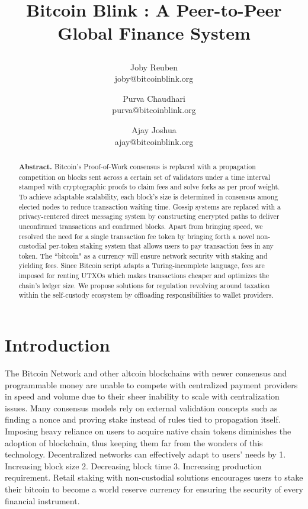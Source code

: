 \documentclass[a4paper, 10pt]{extarticle}
\title{
 \large \textbf{Bitcoin Blink : A Peer-to-Peer Global Finance System}
\author{ \myfontt Joby Reuben \\ \myfontt joby@bitcoinblink.org \and  \myfontt Purva Chaudhari \\ \myfontt purva@bitcoinblink.org \and \myfontt Ajay Joshua \\ \myfontt ajay@bitcoinblink.org}}
\date{}
\begin{document}
\maketitle
\begin{abstract}
\noindent \textbf{Abstract.} Bitcoin's Proof-of-Work consensus is replaced with a propagation competition on blocks sent across a certain set of validators under a time interval stamped with cryptographic proofs to claim fees and solve forks as per proof weight. To achieve adaptable scalability, each block's size is determined in consensus among elected nodes to reduce transaction waiting time. Gossip systems are replaced with a privacy-centered direct messaging system by constructing encrypted paths to deliver unconfirmed transactions and confirmed blocks. Apart from bringing speed, we resolved the need for a single transaction fee token by bringing forth a novel non-custodial per-token staking system that allows users to pay transaction fees in any token. The ``bitcoin" as a currency will ensure network security with staking and yielding fees. Since Bitcoin script adapts a Turing-incomplete language, fees are imposed for renting UTXOs which makes transactions cheaper and optimizes the chain's ledger size. We propose solutions for regulation revolving around taxation within the self-custody ecosystem by offloading responsibilities to wallet providers. 
\end{abstract}
\section{Introduction}
The Bitcoin Network \cite{nakamoto2008bitcoin} and other altcoin blockchains with newer consensus and programmable money are unable to compete with centralized payment providers in speed and volume due to their sheer inability to scale with centralization issues. Many consensus models rely on external validation concepts such as finding a nonce and proving stake instead of rules tied to propagation itself. Imposing heavy reliance on users to acquire native chain tokens diminishes the adoption of blockchain, thus keeping them far from the wonders of this technology. Decentralized networks can effectively adapt to users’ needs by 1. Increasing block size 2. Decreasing block time 3. Increasing production requirement. Retail staking with non-custodial solutions encourages users to stake their bitcoin to become a world reserve currency for ensuring the security of every financial instrument.
\end{document}
